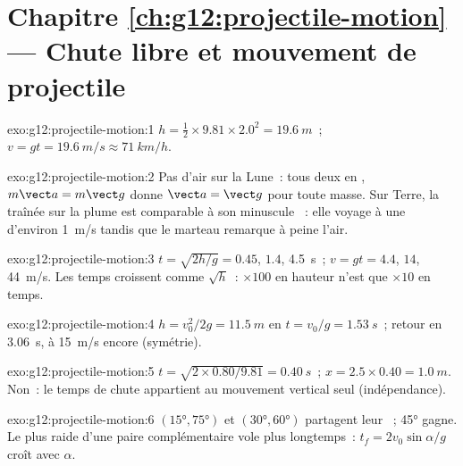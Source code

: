 \section*{Chapitre \ref{ch:g12:projectile-motion} --- Chute libre et mouvement de projectile}

\begin{solution}{exo:g12:projectile-motion:1}
$h = \tfrac12 \times 9.81 \times 2.0^2 = \qty{19.6}{m}$~;
$v = gt = \qty{19.6}{m/s} \approx \qty{71}{km/h}$.
\end{solution}

\begin{solution}{exo:g12:projectile-motion:2}
Pas d'air sur la Lune~: tous deux en ,
$m\vect a = m\vect g$ donne $\vect a = \vect g$ pour toute masse. Sur
Terre, la traînée sur la plume est comparable à son minuscule
~: elle voyage à une 
d'environ \qty{1}{m/s} tandis que le marteau remarque à peine l'air.
\end{solution}

\begin{solution}{exo:g12:projectile-motion:3}
$t = \sqrt{2h/g} = 0.45$, $1.4$, \qty{4.5}{s}~;
$v = gt = 4.4$, $14$, \qty{44}{m/s}. Les temps croissent comme
$\sqrt h$~: $\times 100$ en hauteur n'est que $\times 10$ en temps.
\end{solution}

\begin{solution}{exo:g12:projectile-motion:4}
$h = v_0^2/2g = \qty{11.5}{m}$ en $t = v_0/g = \qty{1.53}{s}$~;
retour en \qty{3.06}{s}, à \qty{15}{m/s} encore (symétrie).
\end{solution}

\begin{solution}{exo:g12:projectile-motion:5}
$t = \sqrt{2 \times 0.80/9.81} = \qty{0.40}{s}$~;
$x = 2.5 \times 0.40 = \qty{1.0}{m}$. Non~: le temps de chute
appartient au mouvement vertical seul (indépendance).
\end{solution}

\begin{solution}{exo:g12:projectile-motion:6}
$(\ang{15},\ang{75})$ et $(\ang{30},\ang{60})$ partagent leur
~; \ang{45} gagne. Le plus raide d'une paire
complémentaire vole plus longtemps~: $t_f = 2v_0\sin\alpha/g$ croît
avec $\alpha$.
\end{solution}

